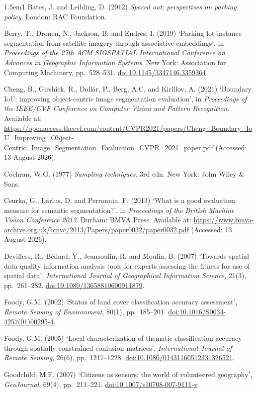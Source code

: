 \begin{hangparas}{1.5em}{1}
Bates, J. and Leibling, D. (2012) \emph{Spaced out: perspectives on parking policy}. London: RAC Foundation.

Berry, T., Dronen, N., Jackson, B. and Endres, I. (2019) `Parking lot instance segmentation from satellite imagery through associative embeddings', in \emph{Proceedings of the 27th ACM SIGSPATIAL International Conference on Advances in Geographic Information Systems}. New York: Association for Computing Machinery, pp.~528--531. \url{doi:10.1145/3347146.3359364}.

Cheng, B., Girshick, R., Dollár, P., Berg, A.C. and Kirillov, A. (2021) `Boundary IoU: improving object-centric image segmentation evaluation', in \emph{Proceedings of the IEEE/CVF Conference on Computer Vision and Pattern Recognition}. Available at: \url{https://openaccess.thecvf.com/content/CVPR2021/papers/Cheng_Boundary_IoU_Improving_Object-Centric_Image_Segmentation_Evaluation_CVPR_2021_paper.pdf} (Accessed: 13 August 2026).

Cochran, W.G. (1977) \emph{Sampling techniques}. 3rd edn. New York: John Wiley \& Sons.

Csurka, G., Larlus, D. and Perronnin, F. (2013) `What is a good evaluation measure for semantic segmentation?', in \emph{Proceedings of the British Machine Vision Conference 2013}. Durham: BMVA Press. Available at: \url{https://www.bmva-archive.org.uk/bmvc/2013/Papers/paper0032/paper0032.pdf} (Accessed: 13 August 2026).

Devillers, R., Bédard, Y., Jeansoulin, R. and Moulin, B. (2007) `Towards spatial data quality information analysis tools for experts assessing the fitness for use of spatial data', \emph{International Journal of Geographical Information Science}, 21(3), pp.~261--282. \url{doi:10.1080/13658810600911879}.

Foody, G.M. (2002) `Status of land cover classification accuracy assessment', \emph{Remote Sensing of Environment}, 80(1), pp.~185--201. \url{doi:10.1016/S0034-4257(01)00295-4}.

Foody, G.M. (2005) `Local characterization of thematic classification accuracy through spatially constrained confusion matrices', \emph{International Journal of Remote Sensing}, 26(6), pp.~1217--1228. \url{doi:10.1080/01431160512331326521}.

Goodchild, M.F. (2007) `Citizens as sensors: the world of volunteered geography', \emph{GeoJournal}, 69(4), pp.~211--221. \url{doi:10.1007/s10708-007-9111-y}.


\end{hangparas}
